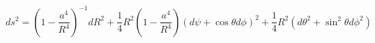 \begin{equation}
ds^2=\left(1-\frac{a^{4}}{R^{4}}\right)^{-1}dR^{2}+\frac{1}{4}
R^{2}\left(1-\frac{a^{4}}{R^{4}}\right)(d\psi+\cos \theta
d\phi)^{2}+\frac{1}{4} R^{2}(d\theta^{2}+\sin^{2}\theta d\phi^{2})
\label{Eguchi-Hanson}
\end{equation}

